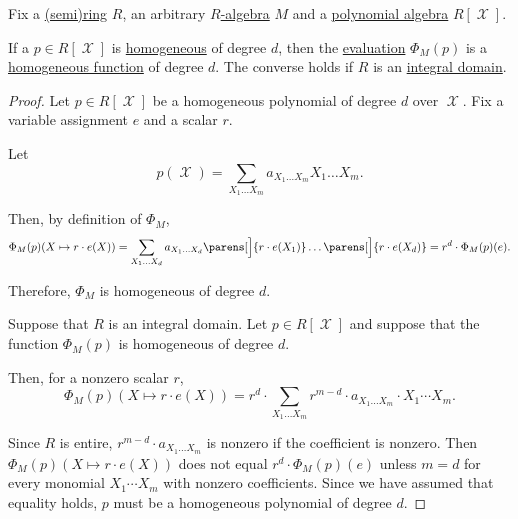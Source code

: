 \begin{proposition}\label{thm:homogeneous_polynomial_iff_homogeneous_function}
  Fix a \hyperref[def:semiring]{(semi)ring} \( R \), an arbitrary \hyperref[def:algebra_over_semiring]{\( R \)-algebra} \( M \) and a \hyperref[def:polynomial_algebra]{polynomial algebra} \( R[\mscrX] \).

  If a \( p \in R[\mscrX] \) is \hyperref[def:homogeneous_polynomial]{homogeneous} of degree \( d \), then the \hyperref[con:evaluation_homomorphism]{evaluation} \( \Phi_M(p) \) is a \hyperref[def:homogenous_function]{homogeneous function} of degree \( d \). The converse holds if \( R \) is an \hyperref[def:integral_domain]{integral domain}.
\end{proposition}
\begin{proof}
  \SufficiencySubProof Let \( p \in R[\mscrX] \) be a homogeneous polynomial of degree \( d \) over \( \mscrX \). Fix a variable assignment \( e \) and a scalar \( r \).

  Let
  \begin{equation*}
    p(\mscrX) = \sum_{X_1 \ldots X_m} a_{X_1 \ldots X_m} X_1 \ldots X_m.
  \end{equation*}

  Then, by definition of \( \Phi_M \),
  \begin{equation*}
    \Phi_M(p)(X \mapsto r \cdot e(X))
    =
    \sum_{X_1 \ldots X_d} a_{X_1 \ldots X_d} \parens[\Big]{ r \cdot e(X_1) } \ldots \parens[\Big]{ r \cdot e(X_d) }
    =
    r^d \cdot \Phi_M(p)(e).
  \end{equation*}

  Therefore, \( \Phi_M \) is homogeneous of degree \( d \).

  \NecessitySubProof Suppose that \( R \) is an integral domain. Let \( p \in R[\mscrX] \) and suppose that the function \( \Phi_M(p) \) is homogeneous of degree \( d \).

  Then, for a nonzero scalar \( r \),
  \begin{equation*}
    \Phi_M(p)(X \mapsto r \cdot e(X))
    =
    r^d \cdot \sum_{X_1 \ldots X_m} r^{m - d} \cdot a_{X_1 \ldots X_m} \cdot X_1 \cdots X_m.
  \end{equation*}

  Since \( R \) is entire, \( r^{m - d} \cdot a_{X_1 \ldots X_m} \) is nonzero if the coefficient is nonzero. Then \( \Phi_M(p)(X \mapsto r \cdot e(X)) \) does not equal \( r^d \cdot \Phi_M(p)(e) \) unless \( m = d \) for every monomial \( X_1 \cdots X_m \) with nonzero coefficients. Since we have assumed that equality holds, \( p \) must be a homogeneous polynomial of degree \( d \).
\end{proof}

